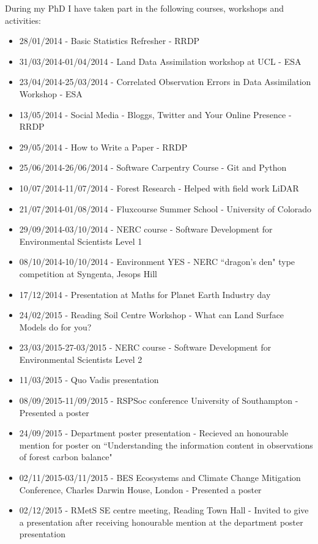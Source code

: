 \documentclass[11pt]{article}
\begin{document}
During my PhD I have taken part in the following courses, workshops and activities:
\begin{itemize}
\item 28/01/2014 - Basic Statistics Refresher - RRDP

\item 31/03/2014-01/04/2014 - Land Data Assimilation workshop at UCL - ESA

\item 23/04/2014-25/03/2014 - Correlated Observation Errors in Data Assimilation Workshop - ESA

\item 13/05/2014 - Social Media - Bloggs, Twitter and Your Online Presence - RRDP

\item 29/05/2014 - How to Write a Paper - RRDP

\item 25/06/2014-26/06/2014 - Software Carpentry Course - Git and Python

\item 10/07/2014-11/07/2014 - Forest Research - Helped with field work LiDAR

\item  21/07/2014-01/08/2014 - Fluxcourse Summer School - University of Colorado

\item 29/09/2014-03/10/2014 - NERC course - Software Development for Environmental Scientists Level 1

\item 08/10/2014-10/10/2014 - Environment YES - NERC ``dragon's den" type competition at Syngenta, Jesops Hill

\item 17/12/2014 - Presentation at Maths for Planet Earth Industry day

\item 24/02/2015 - Reading Soil Centre Workshop - What can Land Surface Models do for you?

\item 23/03/2015-27-03/2015 - NERC course - Software Development for Environmental Scientists Level 2

\item 11/03/2015 - Quo Vadis presentation

\item 08/09/2015-11/09/2015 - RSPSoc conference University of Southampton - Presented a poster

\item 24/09/2015 - Department poster presentation - Recieved an honourable mention for poster on ``Understanding the information content in observations of forest carbon balance"

\item 02/11/2015-03/11/2015 - BES Ecosystems and Climate Change Mitigation Conference, Charles Darwin House, London - Presented a poster

\item 02/12/2015 - RMetS SE centre meeting, Reading Town Hall - Invited to give a presentation after receiving honourable mention at the department poster presentation
\end{itemize}
\end{document}
